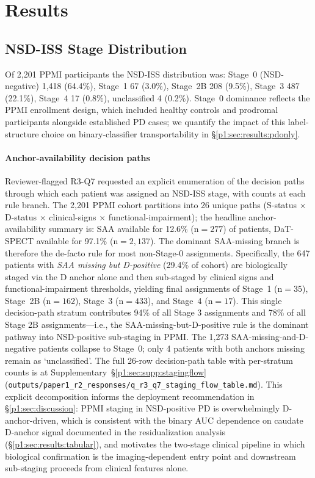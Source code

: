 \section{Results}
\label{p1:sec:results}

\subsection{NSD-ISS Stage Distribution}
Of 2{,}201 PPMI participants the NSD-ISS distribution was: Stage~0 (NSD-negative) 1{,}418 (64.4\%), Stage~1 67 (3.0\%), Stage~2B 208 (9.5\%), Stage~3 487 (22.1\%), Stage~4 17 (0.8\%), unclassified 4 (0.2\%). Stage~0 dominance reflects the PPMI enrollment design, which included healthy controls and prodromal participants alongside established PD cases; we quantify the impact of this label-structure choice on binary-classifier transportability in \S\ref{p1:sec:results:pdonly}.

\paragraph*{Anchor-availability decision paths} Reviewer-flagged R3-Q7 requested an explicit enumeration of the decision paths through which each patient was assigned an NSD-ISS stage, with counts at each rule branch. The 2{,}201 PPMI cohort partitions into 26 unique paths (S-status $\times$ D-status $\times$ clinical-signs $\times$ functional-impairment); the headline anchor-availability summary is: SAA available for 12.6\% (n${=}277$) of patients, DaT-SPECT available for 97.1\% (n${=}2{,}137$). The dominant SAA-missing branch is therefore the de-facto rule for most non-Stage-0 assignments. Specifically, the 647 patients with \emph{SAA missing but D-positive} (29.4\% of cohort) are biologically staged via the D anchor alone and then sub-staged by clinical signs and functional-impairment thresholds, yielding final assignments of Stage~1 (n${=}35$), Stage~2B (n${=}162$), Stage~3 (n${=}433$), and Stage~4 (n${=}17$). This single decision-path stratum contributes 94\% of all Stage 3 assignments and 78\% of all Stage 2B assignments---i.e., the SAA-missing-but-D-positive rule is the dominant pathway into NSD-positive sub-staging in PPMI. The 1{,}273 SAA-missing-and-D-negative patients collapse to Stage~0; only 4 patients with both anchors missing remain as `unclassified'. The full 26-row decision-path table with per-stratum counts is at Supplementary~\S\ref{p1:sec:supp:stagingflow} (\texttt{outputs/paper1\_r2\_responses/q\_r3\_q7\_staging\_flow\_table.md}). This explicit decomposition informs the deployment recommendation in \S\ref{p1:sec:discussion}: PPMI staging in NSD-positive PD is overwhelmingly D-anchor-driven, which is consistent with the binary AUC dependence on caudate D-anchor signal documented in the residualization analysis (\S\ref{p1:sec:results:tabular}), and motivates the two-stage clinical pipeline in which biological confirmation is the imaging-dependent entry point and downstream sub-staging proceeds from clinical features alone.

